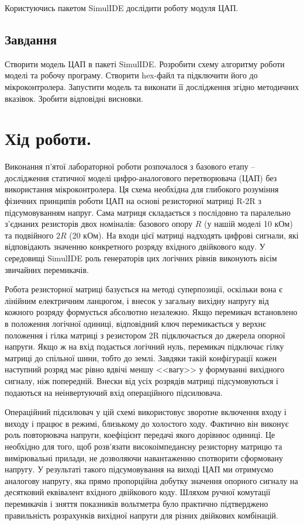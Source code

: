\documentclass[14pt, a4paper]{extreport}
\begin{document}
	Користуючись пакетом SimulIDE дослідити роботу модуля ЦАП.
	
	\subsection*{Завдання}
	
	Створити модель ЦАП в пакеті SimulIDE. Розробити схему алгоритму роботи моделі та робочу програму. Створити hex-файл та підключити його до мікроконтролера. Запустити модель та виконати її дослідження згідно методичних вказівок. Зробити відповідні висновки.
	
	\section*{Хід роботи.}
	
	Виконання п'ятої лабораторної роботи розпочалося з базового етапу -- дослідження статичної моделі цифро-аналогового перетворювача (ЦАП) без використання мікроконтролера. Ця схема необхідна для глибокого розуміння фізичних принципів роботи ЦАП на основі резисторної матриці R-2R з підсумовуванням напруг. Сама матриця складається з послідовно та паралельно з'єднаних резисторів двох номіналів: базового опору $R$ (у нашій моделі 10 кОм) та подвійного $2R$ (20 кОм). На входи цієї матриці надходять цифрові сигнали, які відповідають значенню конкретного розряду вхідного двійкового коду. У середовищі SimulIDE роль генераторів цих логічних рівнів виконують вісім звичайних перемикачів.
	
	
	Робота резисторної матриці базується на методі суперпозиції, оскільки вона є лінійним електричним ланцюгом, і внесок у загальну вихідну напругу від кожного розряду формується абсолютно незалежно. Якщо перемикач встановлено в положення логічної одиниці, відповідний ключ перемикається у верхнє положення і гілка матриці з резистором 2R підключається до джерела опорної напруги. Якщо ж на вхід подається логічний нуль, перемикач підключає гілку матриці до спільної шини, тобто до землі. Завдяки такій конфігурації кожен наступний розряд має рівно вдвічі меншу <<вагу>> у формуванні вихідного сигналу, ніж попередній. Внески від усіх розрядів матриці підсумовуються і подаються на неінвертуючий вхід операційного підсилювача.
	
	Операційний підсилювач у цій схемі використовує зворотне включення входу і виходу і працює в режимі, близькому до холостого ходу. Фактично він виконує роль повторювача напруги, коефіцієнт передачі якого дорівнює одиниці. Це необхідно для того, щоб розв'язати високоімпедансну резисторну матрицю та вимірювальні прилади, не дозволяючи навантаженню спотворити сформовану напругу. У результаті такого підсумовування на виході ЦАП ми отримуємо аналогову напругу, яка прямо пропорційна добутку значення опорного сигналу на десятковий еквівалент вхідного двійкового коду. Шляхом ручної комутації перемикачів і зняття показників вольтметра було практично підтверджено правильність розрахунків вихідної напруги для різних двійкових комбінацій.
	
\end{document}
